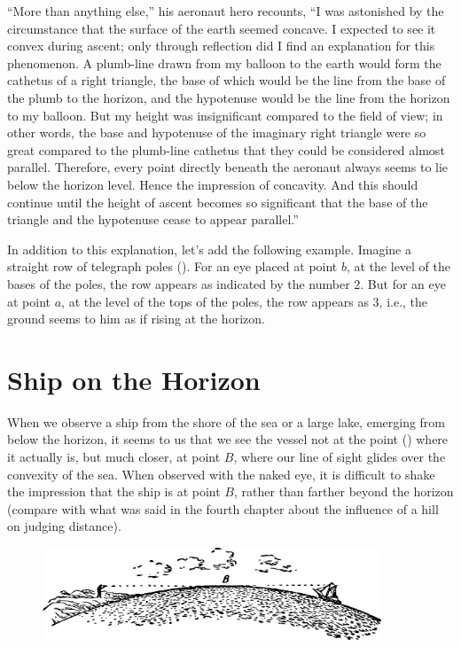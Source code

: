 ``More than anything else,'' his aeronaut hero recounts, ``I was astonished by the circumstance that the surface of the earth seemed concave. I expected to see it convex during ascent; only through reflection did I find an explanation for this phenomenon. A plumb-line drawn from my balloon to the earth would form the cathetus of a right triangle, the base of which would be the line from the base of the plumb to the horizon, and the hypotenuse would be the line from the horizon to my balloon. But my height was insignificant compared to the field of view; in other words, the base and hypotenuse of the imaginary right triangle were so great compared to the plumb-line cathetus that they could be considered almost parallel. Therefore, every point directly beneath the aeronaut always seems to lie below the horizon level. Hence the impression of concavity. And this should continue until the height of ascent becomes so significant that the base of the triangle and the hypotenuse cease to appear parallel.''



In addition to this explanation, let's add the following example. Imagine a straight row of telegraph poles (). For an eye placed at point $b$, at the level of the bases of the poles, the row appears as indicated by the number $\mathit{2}$. But for an eye at point $a$, at the level of the tops of the poles, the row appears as $\mathit{3}$, i.e., the ground seems to him as if rising at the horizon.


\section{Ship on the Horizon}
\label{sec-6.2}

When we observe a ship from the shore of the sea or a large lake, emerging from below the horizon, it seems to us that we see the vessel not at the point () where it actually is, but much closer, at point $B$, where our line of sight glides over the convexity of the sea. When observed with the naked eye, it is difficult to shake the impression that the ship is at point $B$, rather than farther beyond the horizon (compare with what was said in the fourth chapter about the influence of a hill on judging distance).

\begin{figure}[h!]
\centering
\includegraphics[width=0.9\textwidth]{figures/ch-06/fig-100.pdf}
\end{figure}

